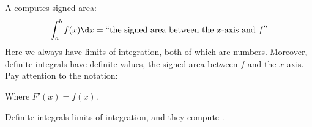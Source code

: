 \documentclass{ximera}
\begin{document}
A  computes signed area:
\[
\int_a^b f(x) \d x = ``\text{the signed area between the $x$-axis and $f$}''
\]
Here we always have limits of integration, both of which are
numbers. Moreover, definite integrals have definite values, the signed
area between $f$ and the $x$-axis. Pay attention to the notation:
\begin{image}
\end{image}
Where $F'(x) = f(x)$.
\begin{explanation}%
  Definite integrals  limits of integration, and they compute
  .
\end{explanation}
\end{document}
